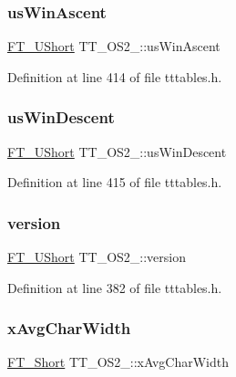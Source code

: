 \subsubsection{\texorpdfstring{usWinAscent}{usWinAscent}}
{\footnotesize\ttfamily \mbox{\hyperlink{fttypes_8h_a937f6c17cf5ffd09086d8610c37b9f58}{F\+T\+\_\+\+U\+Short}} T\+T\+\_\+\+O\+S2\+\_\+\+::us\+Win\+Ascent}



Definition at line 414 of file tttables.\+h.

\mbox{\label{struct_t_t___o_s2___a573ace3da03efa98a716a8443e4d0084}} 
\subsubsection{\texorpdfstring{usWinDescent}{usWinDescent}}
{\footnotesize\ttfamily \mbox{\hyperlink{fttypes_8h_a937f6c17cf5ffd09086d8610c37b9f58}{F\+T\+\_\+\+U\+Short}} T\+T\+\_\+\+O\+S2\+\_\+\+::us\+Win\+Descent}



Definition at line 415 of file tttables.\+h.

\mbox{\label{struct_t_t___o_s2___a012ff79224cd25ae51837ca8937605c4}} 
\subsubsection{\texorpdfstring{version}{version}}
{\footnotesize\ttfamily \mbox{\hyperlink{fttypes_8h_a937f6c17cf5ffd09086d8610c37b9f58}{F\+T\+\_\+\+U\+Short}} T\+T\+\_\+\+O\+S2\+\_\+\+::version}



Definition at line 382 of file tttables.\+h.

\mbox{\label{struct_t_t___o_s2___af903883918479780d17a72f6fee992bd}} 
\subsubsection{\texorpdfstring{xAvgCharWidth}{xAvgCharWidth}}
{\footnotesize\ttfamily \mbox{\hyperlink{fttypes_8h_aa7279be89046a2563cd3d4d6651fbdcf}{F\+T\+\_\+\+Short}} T\+T\+\_\+\+O\+S2\+\_\+\+::x\+Avg\+Char\+Width}



